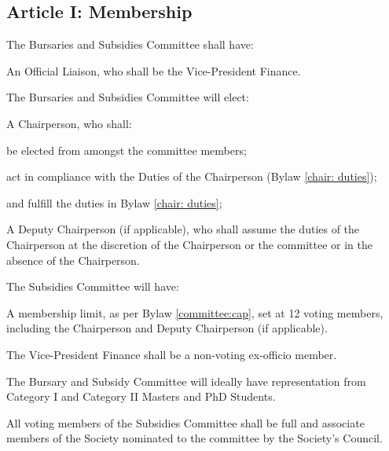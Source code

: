 \subsection{Article I: Membership}
\begin{longenum}[ label*=\thesubsection.\arabic*., align=left] 
	\item The Bursaries and Subsidies Committee shall have:
		\begin{longenum}[ label*=\arabic*., align=left] 
		\item An Official Liaison, who shall be the Vice-President Finance.
		\end{longenum}
	\item The Bursaries and Subsidies Committee will elect:
		\begin{longenum}[ label*=\arabic*., align=left]
		\item A Chairperson, who shall:
			\begin{longenum}[ label*=\arabic*., align=left]
			\item be elected from amongst the committee members;
			\item act in compliance with the Duties of the Chairperson (Bylaw \ref{chair: duties});
			\item and fulfill the duties in Bylaw \ref{chair: duties};
			\item A Deputy Chairperson (if applicable), who shall assume the duties of the Chairperson at the discretion of the Chairperson or the committee or in the absence of the Chairperson.
			\end{longenum}
		\end{longenum}
	\item The Subsidies Committee will have:
		\begin{longenum}[ label*=\arabic*., align=left]
		\item A membership limit, as per Bylaw \ref{committee:cap}, set at 12 voting members, including the Chairperson and Deputy Chairperson (if applicable).
		\end{longenum}
	\item The Vice-President Finance shall be a non-voting ex-officio member.
	\item The Bursary and Subsidy Committee will ideally have representation from Category I and Category II Masters and PhD Students.
	\item All voting members of the Subsidies Committee shall be full and associate members of the Society nominated to the committee by the Society’s Council.     
\end{longenum}

